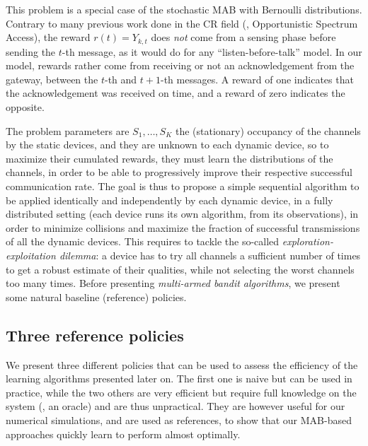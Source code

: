 This problem is a special case of the stochastic MAB with
Bernoulli distributions.
Contrary to many previous work done in the CR field \cite{Jouini10,Jouini12} (\eg, Opportunistic Spectrum Access),
the reward $r(t)=Y_{k,t}$ does \emph{not} come from a sensing phase before sending the $t$-th message, as it would do for any ``listen-before-talk'' model.
In our model, rewards rather come from receiving or not an acknowledgement from the gateway, between the $t$-th and $t+1$-th messages. A reward of one indicates that the acknowledgement was received on time, and a reward of zero indicates the opposite.

The problem parameters
are $S_1, \dots, S_K$ the (stationary) occupancy of the channels by the static devices,
and they are unknown to each dynamic device, so to maximize their cumulated rewards, they must learn the distributions of the channels, in order to be able to progressively improve their respective successful communication rate.
%
The goal is thus to propose a simple sequential algorithm to be applied identically and independently by each dynamic device, in a fully distributed setting (each device runs its own algorithm, from its observations), in order to minimize collisions and maximize the fraction of successful transmissions of all the dynamic devices.
%
This requires to tackle the so-called \emph{exploration-exploitation dilemma}: a device has to try all channels a sufficient number of times to get a robust estimate of their qualities, while not selecting the worst channels too many times.
%
Before presenting \emph{multi-armed bandit algorithms}, we present some natural baseline (reference) policies.


\subsection{Three reference policies}\label{sub:41:threeReferencePolicies}

We present three different policies that can be used to assess the efficiency of the learning algorithms presented later on.
The first one is naive but can be used in practice, while the two others are very efficient but require full knowledge on the system (\ie, an oracle) and are thus unpractical.
%
They are however useful for our numerical simulations, and are used as references, to show that our MAB-based approaches quickly learn to perform almost optimally.


